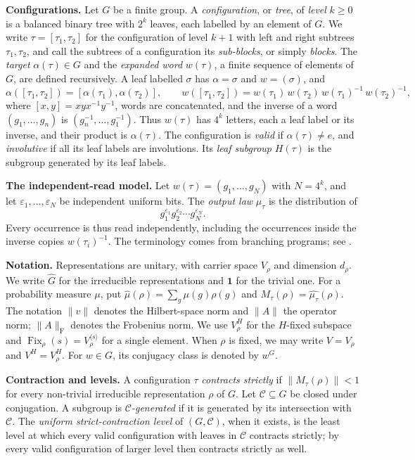 \documentclass[11pt]{amsart}
\theoremstyle{definition}
\theoremstyle{remark}
\theoremstyle{plain}
\theoremstyle{plain}
\numberwithin{equation}{section}
\newcommand{\parhead}[1]{\par\smallskip\noindent\textbf{#1}\enspace}
\DeclareMathOperator{\Fix}{Fix}
\newcommand{\norm}[1]{\lVert #1 \rVert}
\newcommand{\frob}[1]{\norm{#1}_{\mathrm{F}}}
\newcommand{\opn}[1]{\norm{#1}}
\begin{document}
\parhead{Configurations.}
Let $G$ be a finite group. A \emph{configuration}, or \emph{tree}, of
\emph{level} $k\ge0$ is a balanced binary tree with $2^k$ leaves, each
labelled by an element of $G$. We write $\tau=[\tau_1,\tau_2]$ for the
configuration of level $k+1$ with left and right subtrees
$\tau_1,\tau_2$, and call the subtrees of a configuration its
\emph{sub-blocks}, or simply \emph{blocks}. The \emph{target} $\alpha(\tau)\in G$ and the
\emph{expanded word} $w(\tau)$, a finite sequence of elements of $G$,
are defined recursively. A leaf labelled $\sigma$ has $\alpha=\sigma$
and $w=(\sigma)$, and
\[
 \alpha([\tau_1,\tau_2])=[\alpha(\tau_1),\alpha(\tau_2)],\qquad
 w([\tau_1,\tau_2])=w(\tau_1)\,w(\tau_2)\,w(\tau_1)^{-1}\,w(\tau_2)^{-1},
\]
where $[x,y]=xyx^{-1}y^{-1}$, words are concatenated, and the inverse of
a word $(g_1,\ldots,g_n)$ is $(g_n^{-1},\ldots,g_1^{-1})$. Thus $w(\tau)$
has $4^k$ letters, each a leaf label or its inverse, and their product
is $\alpha(\tau)$. The configuration is \emph{valid} if
$\alpha(\tau)\ne e$, and \emph{involutive} if all its leaf labels are
involutions. Its \emph{leaf subgroup} $H(\tau)$ is the subgroup
generated by its leaf labels.

\parhead{The independent-read model.}
Let $w(\tau)=(g_1,\ldots,g_N)$ with $N=4^k$, and let
$\varepsilon_1,\ldots,\varepsilon_N$ be independent uniform bits. The
\emph{output law} $\mu_\tau$ is the distribution of
\[
 g_1^{\varepsilon_1}g_2^{\varepsilon_2}\cdots g_N^{\varepsilon_N}.
\]
Every occurrence is thus read independently, including the occurrences
inside the inverse copies $w(\tau_i)^{-1}$. The terminology comes from
branching programs; see .

\parhead{Notation.}
Representations are unitary, with carrier space $V_\rho$ and dimension
$d_\rho$. We write $\widehat G$ for the irreducible representations and
$\mathbf1$ for the trivial one. For a probability measure $\mu$, put
$\widehat\mu(\rho)=\sum_g\mu(g)\rho(g)$ and
$M_\tau(\rho)=\widehat{\mu_\tau}(\rho)$.
The notation $\norm v$ denotes the Hilbert-space norm and $\norm A$ the
operator norm; $\frob A$ denotes the Frobenius norm.
We use $V_\rho^H$ for the $H$-fixed subspace and
$\Fix_\rho(s)=V_\rho^{\langle s\rangle}$ for a single element.
When $\rho$ is fixed, we may write $V=V_\rho$ and $V^H=V_\rho^H$.
For $w\in G$, its conjugacy class is denoted by $w^G$.

\parhead{Contraction and levels.}
A configuration $\tau$ \emph{contracts strictly} if
$\opn{M_\tau(\rho)}<1$ for every non-trivial irreducible representation
$\rho$ of $G$. Let $\mathcal C\subseteq G$ be closed under conjugation. A
subgroup is \emph{$\mathcal C$-generated} if it is generated by its
intersection with $\mathcal C$. The \emph{uniform strict-contraction
level} of $(G,\mathcal C)$, when it exists, is the least level at which
every valid configuration with leaves in $\mathcal C$ contracts
strictly; by  every valid configuration of larger
level then contracts strictly as well.
\end{document}
